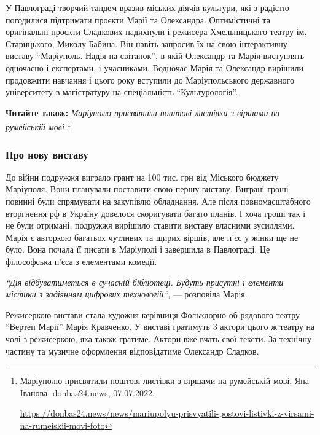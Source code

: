 
У Павлограді творчий тандем вразив міських діячів культури, які з радістю
погодилися підтримати проєкти Марії та Олександра. Оптимістичні та оригінальні
проєкти Сладкових надихнули і режисера Хмельницького театру ім. Старицького,
Миколу Бабина. Він навіть запросив їх на свою інтерактивну виставу \enquote{Маріуполь.
Надія на світанок}, в якій Олександр та Марія виступлять одночасно і
експертами, і учасниками. Водночас Марія та Олександр вирішили продовжити
навчання і цього року вступили до Маріупольського державного університету в
магістратуру на спеціальність \enquote{Культурологія}.

\textbf{Читайте також:} \emph{Маріуполю присвятили поштові листівки з віршами на румейській мові}%
\footnote{Маріуполю присвятили поштові листівки з віршами на румейській мові, Яна Іванова, donbas24.news, 07.07.2022, \par%
\url{https://donbas24.news/news/mariupolyu-prisvyatili-postovi-listivki-z-virsami-na-rumeiskii-movi-foto}%
}

\subsubsection{Про нову виставу}

До війни подружжя виграло грант на 100 тис. грн від Міського бюджету Маріуполя.
Вони планували поставити свою першу виставу. Виграні гроші повинні були
спрямувати на закупівлю обладнання. Але після повномасштабного вторгнення рф в
Україну довелося скоригувати багато планів. І хоча гроші так і не були
отримані, подружжя вирішило ставити виставу власними зусиллями. Марія є
авторкою багатьох чутливих та щирих віршів, але п'єс у жінки ще не було. Вона
почала її писати в Маріуполі і завершила в Павлограді. Це філософська п'єса з
елементами комедії.

\begin{leftbar}
\emph{\enquote{Дія відбуватиметься в сучасній бібліотеці. Будуть присутні і елементи містики з задіянням цифрових технологій}}, — розповіла Марія.
\end{leftbar}

Режисеркою вистави стала художня керівниця Фольклорно-об\hyp{}рядового театру \enquote{Вертеп
Марії} Марія Кравченко. У виставі гратимуть 3 актори цього ж театру на чолі з
режисеркою, яка також гратиме. Актори вже вчать свої тексти. За технічну
частину та музичне оформлення відповідатиме Олександр Сладков. 

